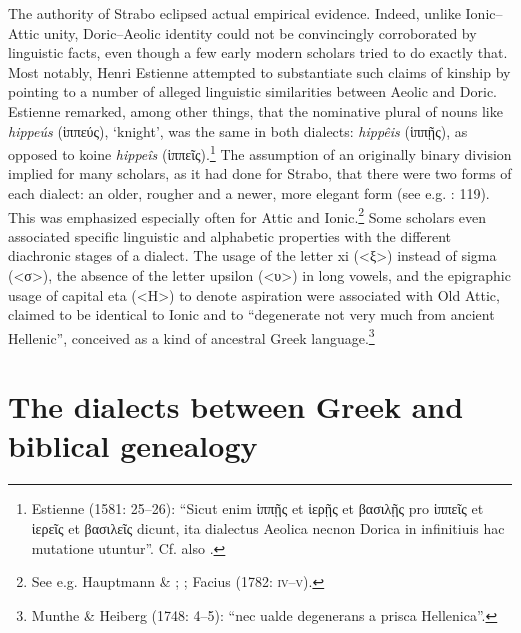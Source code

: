 The authority of Strabo eclipsed actual empirical evidence. Indeed, unlike Ionic–Attic unity, Doric–Aeolic identity could not be convincingly corroborated by linguistic facts, even though a few early modern scholars tried to do exactly that. Most notably, Henri Estienne attempted to substantiate such claims of kinship by pointing to a number of alleged linguistic similarities between Aeolic and Doric. Estienne remarked, among other things, that the nominative plural of nouns like \textit{hippeús} (ἱππεύς), ‘knight’, was the same in both dialects: \textit{hippêis} (ἱππῇς), as opposed to koine \textit{hippeîs} (ἱππεῖς).\footnote{Estienne (1581: 25–26): “Sicut enim ἱππῇς et ἱερῇς et βασιλῇς pro ἱππεῖς et ἱερεῖς et βασιλεῖς dicunt, ita dialectus Aeolica necnon Dorica in infinitiuis hac mutatione utuntur”. Cf. also \citet[179]{Trendelenburg1782}.} The assumption of an originally binary division implied for many scholars, as it had done for Strabo, that there were two forms of each dialect: an older, rougher and a newer, more elegant form (see e.g. \citealt{Mazzocchi1754}: 119). This was emphasized especially often for Attic and Ionic.\footnote{See e.g. Hauptmann \& \citet[18]{Schmid1737}; \citet[137]{Walch1772}; Facius (1782: \textsc{iv–v}).} Some scholars even associated specific linguistic and alphabetic properties with the different diachronic stages of a dialect. The usage of the letter xi (<ξ>) instead of sigma (<σ>), the absence of the letter upsilon (<υ>) in long vowels, and the epigraphic usage of capital eta (<H>) to denote aspiration were associated with Old Attic, claimed to be identical to Ionic and to “degenerate not very much from ancient Hellenic”, conceived as a kind of ancestral Greek language.\footnote{Munthe \& Heiberg (1748: 4–5): “nec ualde degenerans a prisca Hellenica”.}

\section{The dialects between Greek and biblical genealogy}

